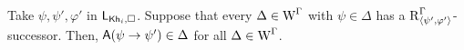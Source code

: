 






\medskip

\begin{proposition}\label{pro:cm-ults-khiml-succpre}
Take $\psi, \psi', \varphi'$ in $\mathsf{L}_{{\sf Kh}_i,\square}$. Suppose that every $\Delta \in \operatorname{W}^\Gamma$ with $\psi \in \Delta$ has a $\operatorname{R}^{\Gamma}_{\langle \psi',\varphi' \rangle}$-successor. Then, ${\sf A}(\psi \rightarrow \psi') \in \Delta$ for all $\Delta \in \operatorname{W}^\Gamma$.
\end{proposition}

